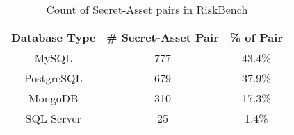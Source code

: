 \begin{table}[!t]
\centering
\caption{Count of Secret-Asset pairs in RiskBench}
\label{asset-types}
\small
\begin{tabular}{|c| c| c|} 
 \hline
 \textbf{Database Type} & \textbf{\# Secret-Asset Pair} & \textbf{\% of Pair} \\ [0.5ex] 
 \hline
 MySQL & 777 & 43.4\%\\ 
 \hline
 PostgreSQL & 679 & 37.9\%\\
 \hline
 MongoDB & 310 & 17.3\%\\
 \hline
 SQL Server & 25 & 1.4\%\\ 
 \hline
\end{tabular}
\end{table}